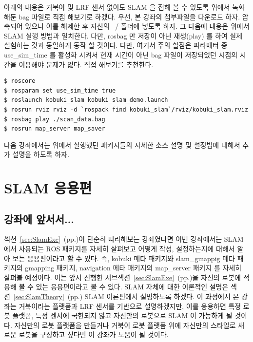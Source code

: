 아래의 내용은 거북이 및 LRF 센서 없이도 SLAM 을 접해 볼 수 있도록 위에서 녹화해둔 bag 파일로 직접 해보기로 하겠다. 우선, 본 강좌의 첨부파일을 다운로드 하자. 압축되어 있으니 이를 해제한 후 자신의 ~/ 폴더에 넣도록 하자. 그 다음에 내용은 위에서 SLAM 실행 방법과 일치한다. 다만, rosbag 만 저장이 아닌 재생(play) 를 하여 실제 실험하는 것과 동일하게 동작 할 것이다. 다만, 여기서 주의 할점은 파라매터 중 use\_sim\_time 를 활성화 시켜서 현재 시간이 아닌 bag 파일이 저장되었던 시점의 시간을 이용해야 문제가 없다. 직접 해보기를 추천한다.

\vspace{\baselineskip}
\begin{lstlisting}[language=ROS]
$ roscore
$ rosparam set use_sim_time true
$ roslaunch kobuki_slam kobuki_slam_demo.launch
$ rosrun rviz rviz -d `rospack find kobuki_slam`/rviz/kobuki_slam.rviz
$ rosbag play ./scan_data.bag
$ rosrun map_server map_saver
\end{lstlisting}

다음 강좌에서는 위에서 실행했던 패키지들의 자세한 소스 설명 및 설정법에 대해서 추가 설명을 하도록 하자.

\section{SLAM 응용편}

\subsection{강좌에 앞서서...}

섹션~\ref{sec:SlamExe}~(pp.\pageref{sec:SlamExe})이 단순히 따라해보는 강좌였다면 이번 강좌에서는 SLAM 에서 사용되는 ROS 패키지를 자세히 살펴보고 어떻게 작성, 설정하는지에 대해서 알아 보는 응용편이라고 할 수 있다. 즉, kobuki 메타 패키지와 slam\_gmappig 메타 패키지의 gmapping 패키지, navigation 메타 패키지의 map\_server 패키지 를 자세히 살펴볼 예정이다. 이는 앞서 진행한 서브섹션~\ref{sec:SlamExe}~(pp.\pageref{sec:SlamExe})을 자신의 로봇에 적용해 볼 수 있는 응용편이라고 볼 수 있다. SLAM 자체에 대한 이론적인 설명은 섹션~\ref{sec:SlamTheory}~(pp.\pageref{sec:SlamTheory}) SLAM 이론편에서 설명하도록 하겠다.
\label{sec:SlamTheory}
이 과정에서 본 강좌는 거북이라는 플랫폼과 LRF 센서를 기반으로 설명하겠지만, 이를 응용하면 특정 로봇 플랫폼, 특정 센서에 국한되지 않고 자신만의 로봇으로 SLAM 이 가능하게 될 것이다. 자신만의 로봇 플랫폼을 만들거나 거북이 로봇 플랫폼 위에 자신만의 스타일로 새로운 로봇을 구성하고 싶다면 이 강좌가 도움이 될 것이다.

